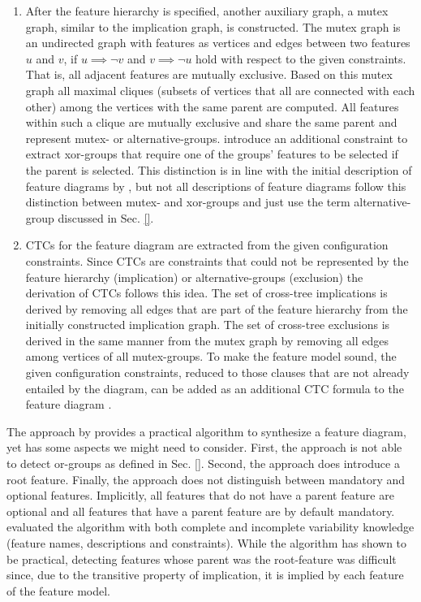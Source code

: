 \begin{enumerate}
  \item After the feature hierarchy is specified, another auxiliary graph, a
  mutex graph, similar to the implication graph, is constructed. The mutex
  graph is an undirected graph with features as vertices and edges between two
  features $u$ and $v$, if $u \implies \neg{v}$ and $v \implies \neg{u}$ hold
  with respect to the given constraints. 
  That is, all adjacent features are mutually exclusive. Based on
  this mutex graph all maximal cliques (subsets of vertices that all are
  connected with each other) among the vertices with the same parent are
  computed. All features within such a clique are mutually exclusive and share
  the same parent and represent mutex- or alternative-groups. \cite{she_reverse_2011} introduce an
  additional constraint to extract xor-groups that require one of the groups’
  features to be selected if the parent is selected. This distinction is in
  line with the initial description of feature diagrams by \cite{kang_feature-oriented_1990},
  but not all descriptions of feature diagrams follow this distinction between
  mutex- and xor-groups and just use the term alternative-group discussed in 
  Sec. \ref{}. %
  
  \item CTCs for the feature diagram are extracted from
  the given configuration constraints. Since CTCs are constraints that could
  not be represented by the feature hierarchy (implication) or
  alternative-groups (exclusion) the derivation of CTCs follows this idea. The
  set of cross-tree implications is derived by removing all edges that are part
  of the feature hierarchy from the initially constructed implication graph.
  The set of cross-tree exclusions is derived in the same manner from the mutex
  graph by removing all edges among vertices of all mutex-groups. To make the
  feature model sound, the given configuration constraints, reduced to those
  clauses that are not already entailed by the diagram, can be added as an
  additional CTC formula to the feature diagram \citep{she_reverse_2011}.
\end{enumerate}

The approach by \cite{she_reverse_2011} provides a practical algorithm to synthesize a
feature diagram, yet has some aspects we might need to consider. First, the
approach is not able to detect or-groups as defined in Sec. \ref{}. Second, the
approach does introduce a root feature. Finally, the approach does not
distinguish between mandatory and optional features. Implicitly, all features
that do not have a parent feature are optional and all features that have a
parent feature are by default mandatory. \cite{she_reverse_2011} evaluated the
algorithm with both complete and incomplete variability knowledge (feature
names, descriptions and constraints). While the algorithm has shown to be
practical, detecting features whose parent was the root-feature was difficult
since, due to the transitive property of implication, it is implied by each
feature of the feature model.

